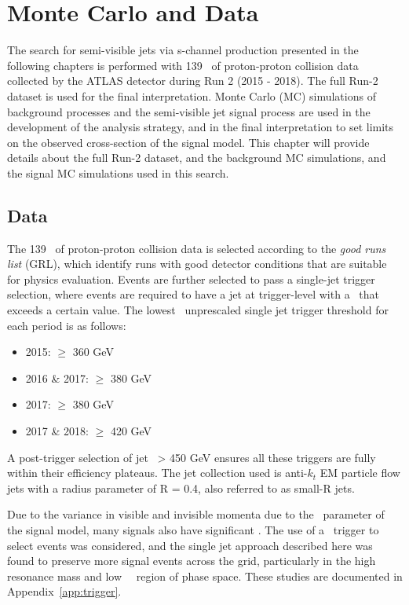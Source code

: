 \chapter{Monte Carlo and Data}
\label{ch:mc_data}

The search for semi-visible jets via s-channel production presented in the following chapters is performed with 139 \fb~of proton-proton collision data collected by the ATLAS detector during Run 2 (2015 - 2018). The full Run-2 dataset is used for the final interpretation. Monte Carlo (MC) simulations of background processes and the semi-visible jet signal process are used in the development of the analysis strategy, and in the final interpretation to set limits on the observed cross-section of the signal model. This chapter will provide details about the full Run-2 dataset, and the background MC simulations, and the signal MC simulations used in this search. 

\section{Data}
The 139 \fb~of proton-proton collision data is selected according to the \textit{good runs list} (GRL), which identify runs with good detector conditions that are suitable for physics evaluation. Events are further selected to pass a single-jet trigger selection, where events are required to have a jet at trigger-level with a \pt~that exceeds a certain value. 
The lowest \pt~unprescaled single jet trigger threshold for each period is as follows: 

\begin{itemize}
\item 2015: \pt $\geq$ 360 GeV
\item 2016 \& 2017:  \pt $\geq$ 380 GeV
\item 2017:  \pt $\geq$ 380 GeV 
\item 2017 \& 2018:  \pt $\geq$ 420 GeV
\end{itemize}

A post-trigger selection of jet \pt~> 450 GeV ensures all these triggers are fully within their efficiency plateaus. The jet collection used is anti-$k_t$ EM particle flow jets with a radius parameter of R = 0.4, also referred to as small-R jets. \par

Due to the variance in visible and invisible momenta due to the \rinv~parameter of the signal model, many signals also have significant \met.
The use of a \met~trigger to select events was considered, and the single jet approach described here was found to preserve more signal events across the grid, particularly in the high resonance mass and low ~\rinv~region of phase space. These studies are documented in Appendix~\ref{app:trigger}.\par

